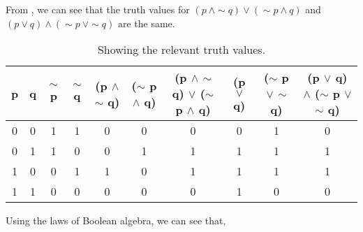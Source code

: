%
%

\begin{subquestions}


\subquestion

\begin{subsubquestions}
	
\subsubquestion

From , we can see that the truth values for $(p ~\land \sim q) \lor (\sim p \land q)$ and $(p \lor q) \land (\sim p ~\lor \sim q)$ are the same.

\begin{table}[ht]
	\centering
	\begin{tabular}{|c|c|c|c|c|c|c|c|c|c|}
		\hline
		p & q & $\sim$ p & $\sim$ q & (p $\land$ $\sim$ q) & ($\sim$ p $\land$ q) & (p $\land$ $\sim$ q) $\lor$ ($\sim$ p $\land$ q) & (p $\lor$ q) & ($\sim$ p $\lor$ $\sim$ q) & (p $\lor$ q) $\land$ ($\sim$ p $\lor$ $\sim$ q) \\
		\hline
		0 & 0 & 1 & 1 & 0 & 0 & 0 & 0 & 1 & 0  \\
		0 & 1 & 1 & 0 & 0 & 1 & 1 & 1 & 1 & 1  \\ 
		1 & 0 & 0 & 1 & 1 & 0 & 1 & 1 & 1 & 1  \\
		1 & 1 & 0 & 0 & 0 & 0 & 0 & 1 & 0 & 0  \\
		\hline
	\end{tabular}
	\caption{\label{2016:q1:tab:TruthTab1} Showing the relevant truth values.}
\end{table}

\subsubquestion

Using the laws of Boolean algebra, we can see that,


\end{subsubquestions}
\end{subquestions}
